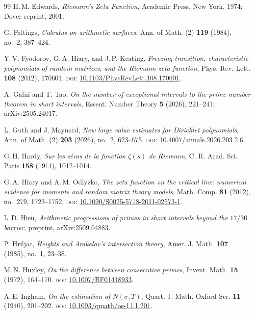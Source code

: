 \documentclass[11pt]{amsart}
\theoremstyle{definition}
\theoremstyle{remark}
\begin{document}
\begin{thebibliography}{99}
H.\,M. Edwards,
\textit{Riemann's Zeta Function},
Academic Press, New York, 1974; Dover reprint, 2001.

G. Faltings,
\textit{Calculus on arithmetic surfaces},
Ann. of Math. (2) \textbf{119} (1984), no.~2, 387--424.

Y.\,V. Fyodorov, G.\,A. Hiary, and J.\,P. Keating,
\textit{Freezing transition, characteristic polynomials of random matrices, and the Riemann zeta function},
Phys. Rev. Lett. \textbf{108} (2012), 170601.
\textsc{doi:} \href{https://doi.org/10.1103/PhysRevLett.108.170601}{10.1103/PhysRevLett.108.170601}.

A. Gafni and T. Tao,
\textit{On the number of exceptional intervals to the prime number theorem in short intervals},
Essent. Number Theory \textbf{5} (2026), 221--241; arXiv:2505.24017.

L. Guth and J. Maynard,
\textit{New large value estimates for Dirichlet polynomials},
Ann. of Math. (2) \textbf{203} (2026), no.~2, 623--675.
\textsc{doi:} \href{https://doi.org/10.4007/annals.2026.203.2.6}{10.4007/annals.2026.203.2.6}.

G.\,H. Hardy,
\textit{Sur les z\'eros de la fonction $\zeta(s)$ de Riemann},
C. R. Acad. Sci. Paris \textbf{158} (1914), 1012--1014.

G.\,A. Hiary and A.\,M. Odlyzko,
\textit{The zeta function on the critical line: numerical evidence for moments and random matrix theory models},
Math. Comp. \textbf{81} (2012), no.~279, 1723--1752.
\textsc{doi:} \href{https://doi.org/10.1090/S0025-5718-2011-02573-1}{10.1090/S0025-5718-2011-02573-1}.

L.\,D. Hieu,
\textit{Arithmetic progressions of primes in short intervals beyond the $17/30$ barrier},
preprint, arXiv:2509.04883.

P. Hriljac,
\textit{Heights and Arakelov's intersection theory},
Amer. J. Math. \textbf{107} (1985), no.~1, 23--38.

M.\,N. Huxley,
\textit{On the difference between consecutive primes},
Invent. Math. \textbf{15} (1972), 164--170.
\textsc{doi:} \href{https://doi.org/10.1007/BF01418933}{10.1007/BF01418933}.

A.\,E. Ingham,
\textit{On the estimation of $N(\sigma, T)$},
Quart. J. Math. Oxford Ser. \textbf{11} (1940), 201--202.
\textsc{doi:} \href{https://doi.org/10.1093/qmath/os-11.1.201}{10.1093/qmath/os-11.1.201}.


\end{thebibliography}
\end{document}
